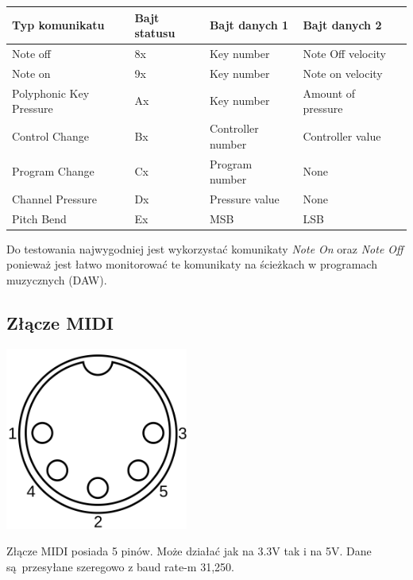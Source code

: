 \documentclass[eng,printmode]{mgr}
\begin{document}
\begin{table}[]
\begin{tabular}{|l|l|l|l|l|}
\hline
\textbf{Typ komunikatu}    &  \textbf{Bajt statusu} & \textbf{Bajt danych 1} & \textbf{Bajt danych 2}  \\ \hline
Note off                   &  8x                    &    Key number          &  Note Off velocity  	   \\ \hline
Note on                    &  9x                    &    Key number          &  Note on velocity       \\ \hline
Polyphonic Key Pressure    &  Ax                    &    Key number          &  Amount of pressure     \\ \hline
Control Change             &  Bx                    &    Controller number   &  Controller value       \\ \hline
Program Change             &  Cx                    &    Program number      &  None                   \\ \hline
Channel Pressure           &  Dx                    &    Pressure value      &  None                   \\ \hline
Pitch Bend                 &  Ex                    &    MSB                 &  LSB                    \\ \hline
\end{tabular}
\end{table}

Do testowania najwygodniej jest wykorzystać komunikaty \textit{Note On} oraz \textit{Note Off} ponieważ jest łatwo monitorować te komunikaty na ścieżkach w programach muzycznych (DAW).

\subsection{Złącze MIDI}
\includegraphics[width=6cm]{midi-jack}

Złącze MIDI posiada 5 pinów. Może działać jak na 3.3V tak i na 5V.
Dane są przesyłane szeregowo z baud rate-m 31,250.
\end{document}
